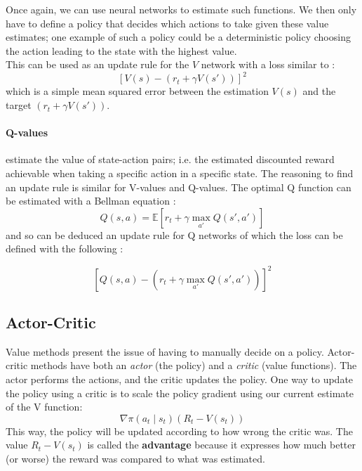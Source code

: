 Once again, we can
use neural networks to estimate such functions. We then only have to define
a policy that decides which actions to take given these value estimates; one
example of such a policy could be a deterministic policy choosing the action
leading to the state with the highest value.\\

This can be used as an update rule for the $V$ network with a loss similar to :
\begin{equation}
	\label{eq:v_update_rule}
\left[V(s) -  \left(r_t + \gamma V(s') \right)\right]^2 
\end{equation}
\noindent which is a simple mean squared error between the estimation $V(s)$ and
the target $\left(r_t + \gamma V(s') \right)$.

\paragraph{Q-values} estimate the value of state-action pairs; i.e. the
estimated discounted reward achievable when taking a specific action in a 
specific state. The reasoning to find an update rule is similar for V-values
and Q-values. The optimal Q function can be estimated with a Bellman equation :
$$ Q(s, a) = \mathbb{E}\left[ r_t + \gamma \max\limits_{a'} Q(s', a') \right]$$
\noindent and so can be deduced an update rule for Q networks of which the loss
can be defined with the following :

\begin{equation}
	\label{eq:q_update_rule}
\left[Q(s, a) - \left( r_t + \gamma \max\limits_{a'} Q(s', a') \right) \right]^2
\end{equation}


\subsection{Actor-Critic}
Value methods present the issue of having to manually decide on a policy.
Actor-critic methods have both an \textit{actor} (the policy) and a
\textit{critic} (value functions). The actor performs the actions, and the 
critic updates the policy. One way to update the policy using a critic is to
scale the policy gradient using our current estimate of the V function:
\begin{equation}
	\label{eq:adv_update_rule}
\nabla \pi(a_t \mid s_t) (R_t - V(s_t))
\end{equation}
This way, the policy will be updated according to how wrong the critic was.
The value $R_t - V(s_t)$ is called the \textbf{advantage} 
because it expresses how much better (or worse) the reward was compared to 
what was estimated.


